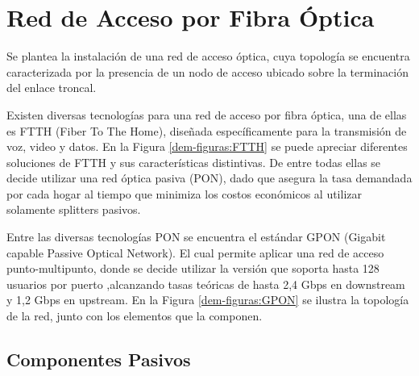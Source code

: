 \section{Red de Acceso por Fibra Óptica}

Se plantea la instalación de una red de acceso óptica, cuya topología se encuentra caracterizada por la presencia de un nodo de acceso ubicado sobre la terminación del enlace troncal.

Existen diversas tecnologías para una red de acceso por fibra óptica, una de ellas es FTTH (Fiber To The Home), diseñada específicamente para la transmisión de voz, video y datos. 
En la Figura \ref{dem-figuras:FTTH} se puede apreciar diferentes soluciones de FTTH y sus características distintivas.
De entre todas ellas se decide utilizar una red óptica pasiva (PON), dado que asegura la tasa demandada por cada hogar al tiempo que minimiza los costos económicos al utilizar solamente splitters pasivos. 

Entre las diversas tecnologías PON se encuentra el estándar GPON (Gigabit capable Passive Optical Network). El cual permite aplicar una red de acceso punto-multipunto, donde se decide utilizar la versión que soporta hasta 128 usuarios por puerto ,alcanzando tasas teóricas de hasta 2,4 Gbps en downstream y 1,2 Gbps en upstream.
En la Figura \ref{dem-figuras:GPON} se ilustra la topología de la red, junto con los elementos que la componen.


\subsection{Componentes Pasivos}



